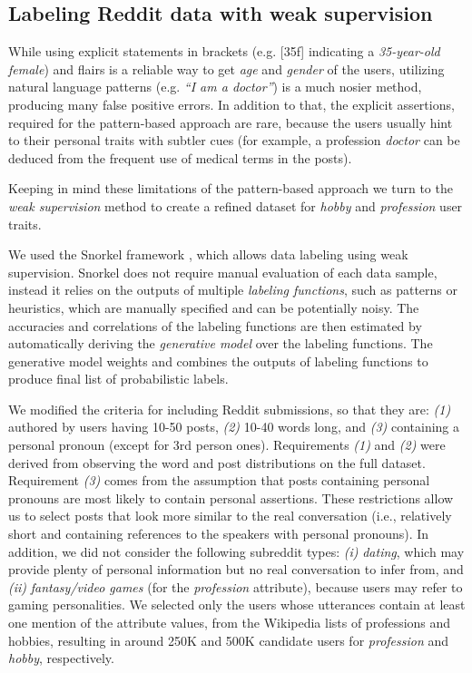 
\subsection{Labeling Reddit data with weak supervision}
\label{data_snorkel}

While using explicit statements in brackets (e.g. [35f] indicating a \textit{35-year-old female}) and flairs is a reliable way to get \textit{age} and \textit{gender} of the users, utilizing natural language patterns (e.g. \textit{``I am a doctor''}) is a much nosier method, producing many false positive errors. In addition to that, the explicit assertions, required for the pattern-based approach are rare, because the users usually hint to their personal traits with subtler cues (for example, a profession \textit{doctor} can be deduced from the frequent use of medical terms in the posts). 

Keeping in mind these limitations of the pattern-based approach we turn to the \textit{weak supervision} method to create a refined dataset for \textit{hobby} and \textit{profession} user traits. 

 We used the \gls{Snorkel framework} \cite{ratner2017snorkel}, which allows data labeling using weak supervision. 
Snorkel does not require manual evaluation of each data sample, instead it relies on the outputs of multiple \textit{labeling functions}, such as patterns or heuristics, which are manually specified and can be potentially noisy. The accuracies and correlations of the labeling functions are then estimated by automatically deriving the \textit{generative model} over the labeling functions. The generative model weights and combines the outputs of labeling functions to produce final list of probabilistic labels.

\vspace{10pt}

We modified the criteria for including Reddit submissions, so that they are:
\emph{(1)} authored by users having 10-50 posts, \emph{(2)} 10-40 words long, and \emph{(3)} containing a personal pronoun (except for 3rd person ones).
Requirements \emph{(1)} and \emph{(2)} were derived from observing the word and post distributions on the full dataset.
Requirement \emph{(3)} comes from the assumption that posts containing personal pronouns are most likely to contain personal assertions. These restrictions allow us to select posts that look more similar to the real conversation (i.e., relatively short and containing references to the speakers with personal pronouns).
In addition, we did not consider the following subreddit types: \emph{(i)} \emph{dating}, which may provide plenty of personal information but no real conversation to infer from,
and \emph{(ii)} \emph{fantasy/video games} (for the \emph{profession} attribute), because users may refer to gaming personalities.
We selected only the users whose utterances contain at least one mention of the attribute values, from the Wikipedia lists of professions and hobbies,
resulting in around 250K and 500K candidate users for \textit{profession} and \textit{hobby}, respectively.

